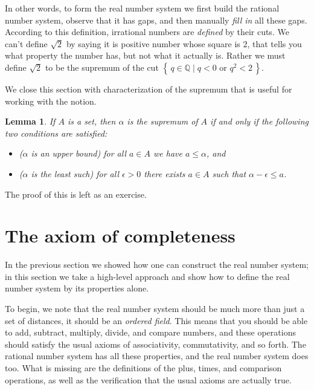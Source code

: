 \documentclass[11pt,oneside]{amsbook}
\newcommand{\set}[1]{\left\{\,#1\,\right\}}
\newcommand{\QQ}{\mathbb Q}
\theoremstyle{definition}
\theoremstyle{plain}
\newtheorem{lem}[thm]{Lemma}
\theoremstyle{definition}
\theoremstyle{remark}
\numberwithin{equation}{section}
\numberwithin{figure}{section}
\begin{document}
In other words, to form the real number system we first build the rational number system, observe that it has gaps, and then manually \emph{fill in} all these gaps. According to this definition, irrational numbers are \emph{defined} by their cuts. We can't define $\sqrt2$ by saying it is positive number whose square is $2$, that tells you what property the number has, but not what it actually is. Rather we must define $\sqrt2$ to be the supremum of the cut $\set{q\in\QQ\mid q<0\text{ or }q^2<2}$.

We close this section with characterization of the supremum that is useful for working with the notion.

\begin{lem}
  If $A$ is a set, then $\alpha$ is the supremum of $A$ if and only if the following two conditions are satisfied:
  \begin{itemize}
  \item ($\alpha$ is an upper bound) for all $a\in A$ we have $a\leq\alpha$, and
  \item ($\alpha$ is the least such) for all $\epsilon>0$ there exists $a\in A$ such that $\alpha-\epsilon\leq a$.
  \end{itemize}
\end{lem}

The proof of this is left as an exercise.

\newpage
\section{The axiom of completeness}

In the previous section we showed how one can construct the real number system; in this section we take a high-level approach and show how to define the real number system by its properties alone.

To begin, we note that the real number system should be much more than just a set of distances, it should be an \emph{ordered field}. This means that you should be able to add, subtract, multiply, divide, and compare numbers, and these operations should satisfy the usual axioms of associativity, commutativity, and so forth. The rational number system has all these properties, and the real number system does too. What is missing are the definitions of the plus, times, and comparison operations, as well as the verification that the usual axioms are actually true.
\end{document}
